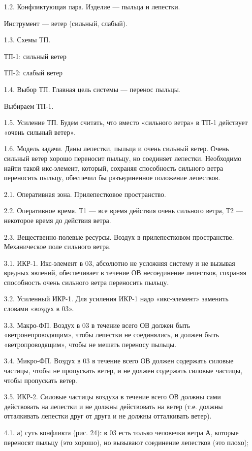 1.2. Конфликтующая пара. Изделие — пыльца и лепестки.

Инструмент — ветер (сильный, слабый).

1.3. Схемы ТП.

ТП-1: сильный ветер


ТП-2: слабый ветер


1.4. Выбор ТП. Главная цель системы — перенос пыльцы.

Выбираем ТП-1.

1.5. Усиление  ТП. Будем считать,  что вместо «сильного ветра»  в ТП-1
действует «очень сильный ветер».


1.6.  Модель задачи.  Даны  лепестки, пыльца  и  очень сильный  ветер.
Очень сильный  ветер хорошо  переносит пыльцу, но  соединяет лепестки.
Необходимо  найти  такой  икс-элемент, который,  сохраняя  способность
сильного ветра переносить пыльцу, обеспечил бы разъединенное положение
лепестков.

2.1. Оперативная зона. Прилепестковое пространство.

2.2. Оперативное время. Т1 —  все время действия очень сильного ветра,
Т2 — некоторое время до действия ветра.

2.3.    Вещественно-полевые   ресурсы.    Воздух   в    прилепестковом
пространстве. Механическое поле сильного ветра.

3.1.  ИКР-1. Икс-элемент  в 03,  абсолютно  не усложняя  систему и  не
вызывая  вредных  явлений,  обеспечивает  в  течение  ОВ  несоединение
лепестков,  сохраняя  способность   очень  сильного  ветра  переносить
пыльцу.

3.2. Усиленный  ИКР-1. Для усиления ИКР-1  надо «икс-элемент» заменить
словами «воздух в 03».

3.3.  Макро-ФП.   Воздух  в  03   в  течение  всего  ОВ   должен  быть
«ветронепроводящим»,  чтобы лепестки  не  соединялись,  и должен  быть
«ветропроводящим», чтобы не мешать переносу пыльцы.

3.4. Микро-ФП. Воздух в 03 в течение всего ОВ должен содержать силовые
частицы,  чтобы не  пропускать ветер,  и не  должен содержать  силовые
частицы, чтобы пропускать ветер.

3.5. ИКР-2.  Силовые частицы  воздуха в течение  всего ОВ  должны сами
действовать на лепестки и не  должны действовать на ветер (т.е. должны
отталкивать лепестки друг от друга и не должны отталкивать ветер).

4.1. а)  суть конфликта (рис.  24): в  03 есть только  человечки ветра
А,  которые  переносят пыльцу  (это  хорошо),  но вызывают  соединение
лепестков (это плохо);

